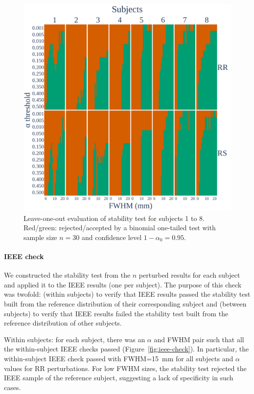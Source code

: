\documentclass[lettersize,journal]{IEEEtran}
\begin{document}
\begin{figure}
  \centering
  \includegraphics[width=\linewidth]{figures/loo_fwe_bonferroni.pdf}
  \caption{Leave-one-out evaluation of stability test for subjects 1 to 8.
    Red/green: rejected/accepted by a binomial one-tailed test with sample size $n=30$ and confidence level $1-\alpha_0=0.95$.}
  \label{fig:loo_bonferroni}
\end{figure}


\paragraph{IEEE check} We constructed the stability test from the $n$ perturbed results for each subject and applied it to the IEEE results (one per subject). The purpose of this check was twofold: (within subjects) to verify that IEEE results passed the stability test built from the reference distribution of their corresponding subject and (between subjects) to verify that IEEE results failed the stability test built from the reference distribution of other subjects.

Within subjects: for each subject, there was an $\alpha$ and FWHM pair such that all the within-subject IEEE checks passed (Figure~\ref{fig:ieee-check}). In particular, the within-subject IEEE check passed with FWHM=15~mm for all subjects and $\alpha$ values for RR perturbations. For low FWHM sizes, the stability test rejected the IEEE sample of the reference subject, suggesting a lack of specificity in such cases.
\end{document}
